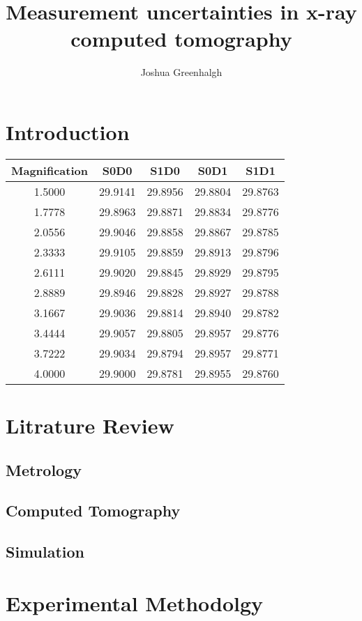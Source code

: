 \documentclass[
  twoside,
  11pt, a4paper,
  footinclude=true,
  headinclude=true,
  cleardoublepage=empty
]{scrbook}
\title{Measurement uncertainties in x-ray computed tomography}
\author{Joshua Greenhalgh}
\begin{document}
\maketitle





\chapter{Introduction}

\begin{tabular}{|c|cccc|}
\toprule
{} Magnification &     S0D0 &     S1D0 &     S0D1 &     S1D1 \\
\midrule
1.5000        &  29.9141 &  29.8956 &  29.8804 &  29.8763 \\
1.7778        &  29.8963 &  29.8871 &  29.8834 &  29.8776 \\
2.0556        &  29.9046 &  29.8858 &  29.8867 &  29.8785 \\
2.3333        &  29.9105 &  29.8859 &  29.8913 &  29.8796 \\
2.6111        &  29.9020 &  29.8845 &  29.8929 &  29.8795 \\
2.8889        &  29.8946 &  29.8828 &  29.8927 &  29.8788 \\
3.1667        &  29.9036 &  29.8814 &  29.8940 &  29.8782 \\
3.4444        &  29.9057 &  29.8805 &  29.8957 &  29.8776 \\
3.7222        &  29.9034 &  29.8794 &  29.8957 &  29.8771 \\
4.0000        &  29.9000 &  29.8781 &  29.8955 &  29.8760 \\
\bottomrule
\end{tabular}

\chapter{Litrature Review}
\section{Metrology}
\section{Computed Tomography}
\section{Simulation}
\chapter{Experimental Methodolgy}
\end{document}
